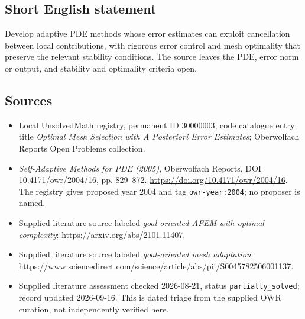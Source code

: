 \documentclass[11pt]{article}
\begin{document}
\subsection{Short English statement}
Develop adaptive PDE methods whose error estimates can exploit cancellation between local contributions, with rigorous error control and mesh optimality that preserve the relevant stability conditions. The source leaves the PDE, error norm or output, and stability and optimality criteria open.
\subsection{Sources}
\begin{itemize}\item Local UnsolvedMath registry, permanent ID 30000003, code catalogue entry; title \emph{Optimal Mesh Selection with A Posteriori Error Estimates}; Oberwolfach Reports Open Problems collection.\item \emph{Self-Adaptive Methods for PDE (2005)}, Oberwolfach Reports, DOI 10.4171/owr/2004/16, pp. 829--872. \url{https://doi.org/10.4171/owr/2004/16}. The registry gives proposed year 2004 and tag \texttt{owr-year:2004}; no proposer is named.\item Supplied literature source labeled \emph{goal-oriented AFEM with optimal complexity}: \url{https://arxiv.org/abs/2101.11407}.\item Supplied literature source labeled \emph{goal-oriented mesh adaptation}: \url{https://www.sciencedirect.com/science/article/abs/pii/S0045782506001137}.\item Supplied literature assessment checked 2026-08-21, status \texttt{partially\_solved}; record updated 2026-09-16. This is dated triage from the supplied OWR curation, not independently verified here.\end{itemize}
\end{document}
